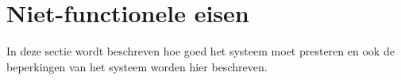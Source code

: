 \section{Niet-functionele eisen}

In deze sectie wordt beschreven hoe goed het systeem moet presteren en ook de beperkingen van het systeem worden hier beschreven.




